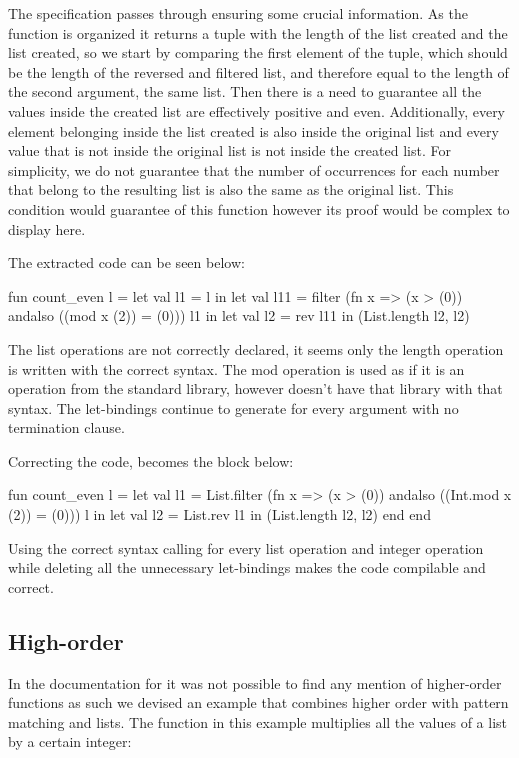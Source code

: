 The specification passes through ensuring some crucial information. As the function is organized it returns a tuple with the 
length of the list created and the list created, so we start by comparing the first element of the tuple, which should be the length of 
the reversed and filtered list, and therefore equal to the length of the second argument, the same list. Then there is a need to 
guarantee all the values inside the created list are effectively positive and even. Additionally, every element belonging inside
the list created is also inside the original list and every value that is not inside the original list is not inside the created 
list. For simplicity, we do not guarantee that the number of occurrences for each number that belong to the resulting list is also 
the same as the original list. This condition would guarantee of this function however its proof would be complex to display here.

The extracted code can be seen below:

\begin{cakeml}
fun count_even l =
  let val l1 = l in
  let val l11 = filter (fn x => (x > (0)) andalso ((mod x (2)) = (0))) l1 in
  let val l2 = rev l11 in (List.length l2, l2)
\end{cakeml}

The list operations are not correctly declared, it seems only the length operation is written with the correct syntax. The mod operation
is used as if it is an operation from the standard library, however \cml doesn't have that library with that syntax. The let-bindings 
continue to generate for every argument with no termination clause.

Correcting the code, becomes the block below:

\begin{cakeml}
fun count_even l =
  let val l1 = List.filter (fn x => (x > (0)) andalso ((Int.mod x (2)) = (0))) l in
  let val l2 = List.rev l1 in (List.length l2, l2) end end
\end{cakeml}

Using the correct syntax calling for every list operation and integer operation while deleting all the unnecessary let-bindings makes the
code compilable and correct.

\subsection{High-order}

In the documentation for \cml it was not possible to find any mention of higher-order functions as such we devised an example that
combines higher order with pattern matching and lists. The function in this example multiplies all the values of a list by a certain
integer:

